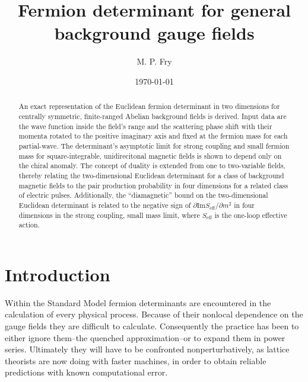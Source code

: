 \documentclass[a4paper,twocolumn,showpacs,preprintnumbers,amsmath,amssymb]{revtex4}
\begin{document}
\title{Fermion determinant for general background gauge fields}

\author{M. P. Fry}


\date{\today}

\begin{abstract}
An exact representation of the Euclidean fermion determinant in two
dimensions for centrally symmetric, finite-ranged Abelian background
fields is derived. Input data are the wave function inside the field's
range and the scattering phase shift with their momenta rotated to the
positive imaginary axis and fixed at the fermion mass for each
partial-wave. The determinant's asymptotic limit for strong coupling
and small fermion mass for square-integrable, unidirecitonal magnetic
fields is shown to depend only on the chiral anomaly. The concept of
duality is extended from one to two-variable fields, thereby relating
the two-dimensional Euclidean determinant for a class of background
magnetic fields to the pair production probability in four dimensions
for a related class of electric pulses. Additionally, the
``diamagnetic'' bound on the two-dimensional Euclidean determinant is
related to the negative sign of
$\partial \text{Im}S_{\text{eff}}/\partial m^2$ in four dimensions in
the strong coupling, small mass limit, where $S_{\text{eff}}$ is the
one-loop effective action.
\end{abstract}


\maketitle


\section{\label{Sec_SecI}
Introduction}


Within the Standard Model fermion determinants are encountered in
the calculation of every physical process. Because of their nonlocal
dependence on the gauge fields they are difficult to calculate.
Consequently the practice has been to either ignore them--the quenched
approximation--or to expand them in power series. Ultimately they will
have to be confronted nonperturbatively, as lattice theorists are now
doing with faster machines, in order to obtain reliable predictions
with known computational error.
\end{document}
